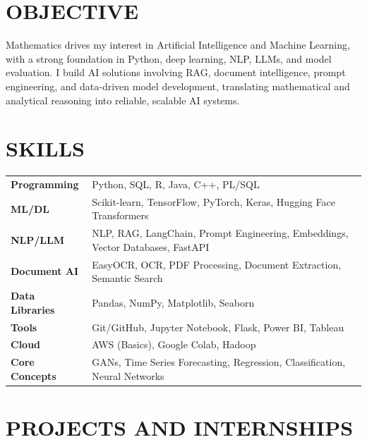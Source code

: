 \documentclass[10pt]{article}
\begin{document}
\pagestyle{others}
\thispagestyle{first_page}


\section{OBJECTIVE}

Mathematics drives my interest in Artificial Intelligence and Machine Learning, with a strong foundation in Python, deep learning, NLP, LLMs, and model evaluation. I build AI solutions involving RAG, document intelligence, prompt engineering, and data-driven model development, translating mathematical and analytical reasoning into reliable, scalable AI systems.




\section{SKILLS}

\begin{tabular}{ l l }
\textbf{Programming} & Python, SQL, R, Java, C++, PL/SQL \\
\textbf{ML/DL} & Scikit-learn, TensorFlow, PyTorch, Keras, Hugging Face Transformers \\
\textbf{NLP/LLM} & NLP, RAG, LangChain, Prompt Engineering, Embeddings, Vector Databases, FastAPI \\
\textbf{Document AI} & EasyOCR, OCR, PDF Processing, Document Extraction, Semantic Search \\
\textbf{Data Libraries} & Pandas, NumPy, Matplotlib, Seaborn \\
\textbf{Tools} & Git/GitHub, Jupyter Notebook, Flask, Power BI, Tableau \\
\textbf{Cloud} & AWS (Basics), Google Colab, Hadoop \\
\textbf{Core Concepts} & GANs, Time Series Forecasting, Regression, Classification, Neural Networks \\
\end{tabular}


\section{PROJECTS AND INTERNSHIPS}
\end{document}
